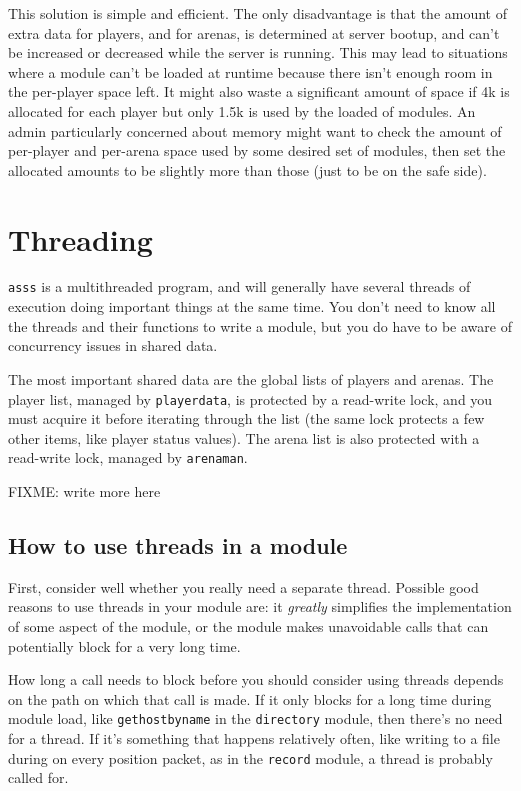\documentclass{article}
\newcommand{\asss}{\texttt{asss}}
\begin{document}
This solution is simple and efficient. The only disadvantage is that the
amount of extra data for players, and for arenas, is determined at
server bootup, and can't be increased or decreased while the server is
running. This may lead to situations where a module can't be loaded at
runtime because there isn't enough room in the per-player space left. It
might also waste a significant amount of space if 4k is allocated for
each player but only 1.5k is used by the loaded of modules. An admin
particularly concerned about memory might want to check the amount of
per-player and per-arena space used by some desired set of modules, then
set the allocated amounts to be slightly more than those (just to be on
the safe side).


\section{Threading}

\asss{} is a multithreaded program, and will generally have several
threads of execution doing important things at the same time. You don't
need to know all the threads and their functions to write a module, but
you do have to be aware of concurrency issues in shared data.

The most important shared data are the global lists of players and
arenas. The player list, managed by \verb/playerdata/, is protected by a
read-write lock, and you must acquire it before iterating through the
list (the same lock protects a few other items, like player status
values). The arena list is also protected with a read-write lock,
managed by \verb/arenaman/.

FIXME: write more here


\subsection{How to use threads in a module}

First, consider well whether you really need a separate thread. Possible
good reasons to use threads in your module are: it \emph{greatly}
simplifies the implementation of some aspect of the module, or the
module makes unavoidable calls that can potentially block for a very
long time.

How long a call needs to block before you should consider using threads
depends on the path on which that call is made. If it only blocks for a
long time during module load, like \verb/gethostbyname/ in the
\verb/directory/ module, then there's no need for a thread. If it's
something that happens relatively often, like writing to a file during
on every position packet, as in the \verb/record/ module, a thread is
probably called for.
\end{document}
